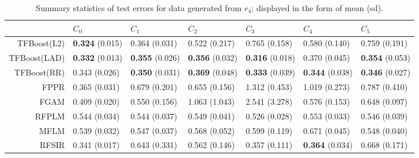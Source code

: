 \begin{table}[H]
\centering
\footnotesize
\begin{tabular}{rllllll}
  \hline
 & $C_0$ & $C_1$ & $C_2$ & $C_3$ & $C_4$ & $C_5$ \\ 
  \hline
TFBoost(L2) & \textbf{0.324} (0.015) & 0.364 (0.031) & 0.522 (0.217) & 0.765 (0.158) & 0.580 (0.140) & 0.759 (0.191) \\ 
  TFBoost(LAD) & \textbf{0.332} (0.013) & \textbf{0.355} (0.026) & \textbf{0.356} (0.032) & \textbf{0.316} (0.018) & 0.370 (0.045) & \textbf{0.354} (0.053) \\ 
  TFBoost(RR) & 0.343 (0.026) & \textbf{0.350} (0.031) & \textbf{0.369} (0.048) & \textbf{0.333} (0.039) & \textbf{0.344} (0.038) & \textbf{0.346} (0.027) \\ 
  FPPR & 0.365 (0.031) & 0.679 (0.201) & 0.655 (0.156) & 1.312 (0.453) & 1.019 (0.273) & 0.787 (0.410) \\ 
  FGAM & 0.409 (0.020) & 0.550 (0.156) & 1.063 (1.043) & 2.541 (3.278) & 0.576 (0.153) & 0.648 (0.097) \\ 
  RFPLM & 0.544 (0.034) & 0.544 (0.037) & 0.549 (0.041) & 0.526 (0.028) & 0.553 (0.033) & 0.546 (0.039) \\ 
  MFLM & 0.539 (0.032) & 0.547 (0.037) & 0.568 (0.052) & 0.599 (0.119) & 0.671 (0.045) & 0.548 (0.040) \\ 
  RFSIR & 0.341 (0.017) & 0.643 (0.331) & 0.562 (0.146) & 0.357 (0.111) & \textbf{0.364} (0.034) & 0.668 (0.171) \\ 
   \hline
\end{tabular}
\caption{Summary statistics of test errors for data generated from $r_4$; displayed in the form of mean (sd).} 
\end{table}

